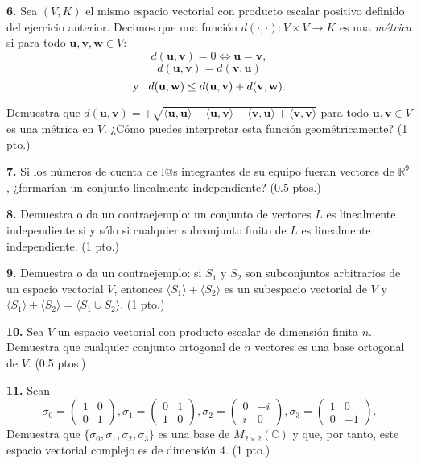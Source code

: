 \documentclass[a4paper]{article}
\begin{document}
\vspace{1cm}
\textbf{6.} Sea $(V,K)$ el mismo espacio vectorial con producto escalar positivo definido del ejercicio anterior. Decimos que una función $d(\cdot,\cdot):V\times V\to K$ es una \emph{métrica} si para todo $\mathbf{u},\mathbf{v},\mathbf{w}\in V:$ \[
    d(\mathbf{u},\mathbf{v})=0 \iff \mathbf{u}=\mathbf{v}, \] \[ d(\mathbf{u},\mathbf{v})=d(\mathbf{v},\mathbf{u})
    \] \[\text{y}\hspace{3mm} 
d(\mathbf{u},\mathbf{w})\le d(\mathbf{u},\mathbf{v})+d(\mathbf{v},\mathbf{w})
.\]

\vspace{3mm}
\noindent Demuestra que $d(\mathbf{u},\mathbf{v})=+\sqrt{\langle \mathbf{u},\mathbf{u}\rangle-\langle\mathbf{u},\mathbf{v}\rangle-\langle\mathbf{v},\mathbf{u}\rangle+\langle\mathbf{v},\mathbf{v}\rangle}$ para todo $\mathbf{u},\mathbf{v}\in V$ es una métrica en $V$. ¿Cómo puedes interpretar esta función geométricamente? (1 pto.)

\vspace{1cm}
\textbf{7.} Si los números de cuenta de l@s integrantes de su equipo fueran vectores de $\mathbb{R}^9$, ¿formarían un conjunto linealmente independiente? (0.5 ptos.)

\vspace{1cm}
\textbf{8.} Demuestra o da un contraejemplo: un conjunto de vectores $L$ es linealmente independiente si y sólo si cualquier subconjunto finito de $L$ es linealmente independiente. (1 pto.)

\vspace{1cm}
\textbf{9.} Demuestra o da un contraejemplo: si $S_1$ y $S_2$ son subconjuntos arbitrarios de un espacio vectorial $V$, entonces $\langle S_1\rangle+\langle S_2\rangle$ es un subespacio vectorial de $V$ y $\langle S_1\rangle+\langle S_2\rangle=\langle S_1\cup S_2\rangle.$  (1 pto.)

\vspace{1cm}
\textbf{10.} Sea $V$ un espacio vectorial con producto escalar de dimensión finita $n$. Demuestra que cualquier conjunto ortogonal de $n$ vectores es una base ortogonal de $V$. (0.5 ptos.)

\vspace{1cm}
\textbf{11.} Sean \[
    \sigma_0 = \begin{pmatrix} 1&0\\0&1 \end{pmatrix}, \sigma_1 = \begin{pmatrix} 0&1\\1&0 \end{pmatrix}, \sigma_2 = \begin{pmatrix} 0&-i\\i&0 \end{pmatrix}, \sigma_3 = \begin{pmatrix} 1&0\\0&-1 \end{pmatrix}   
.\] Demuestra que $\{\sigma_0, \sigma_1, \sigma_2, \sigma_3\}$ es una base de $M_{2\times 2}(\mathbb{C})$ y que, por tanto, este espacio vectorial complejo es de dimensión $4$. (1 pto.)
\end{document}
